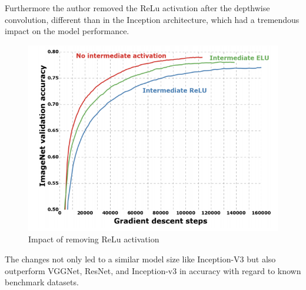 Furthermore the author removed the ReLu activation after the depthwise convolution, different than in the Inception architecture, which had a tremendous impact on the model performance.
\begin{figure}
  \centering
  \includegraphics[width=\linewidth]{figures/xception_activation.png}
  \caption{Impact of removing ReLu activation}
  \label{xception_activation}
\end{figure}

The changes not only led to a similar model size like Inception-V3 but also outperform  VGGNet, ResNet, and Inception-v3 in accuracy with regard to known benchmark datasets\cite{chollet2017xception}.


